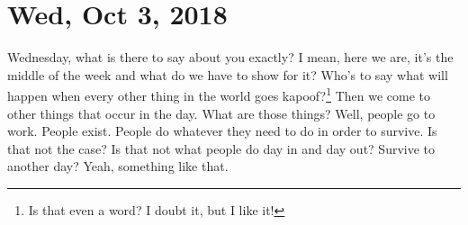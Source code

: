 \section{Wed, Oct 3, 2018}

Wednesday, what is there to say about you exactly? I mean, here we are, it's the middle
of the week and what do we have to show for it? Who's to say what will happen when every
other thing in the world goes kapoof?\footnote{Is that even a word? I doubt it, but I
like it!} Then we come to other things that occur in the day. What are those things?
Well, people go to work. People exist. People do whatever they need to do in order
to survive. Is that not the case? Is that not what people do day in and day out? Survive
to another day? Yeah, something like that.
